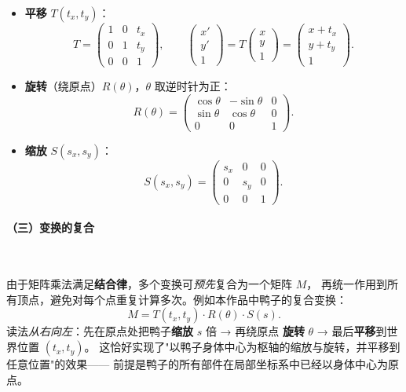 \documentclass[12pt, a4paper]{article}
\begin{document}
\begin{itemize}[leftmargin=*]
    \item \textbf{平移} $T(t_x, t_y)$：
    \[
    T = \begin{pmatrix}1 & 0 & t_x \\ 0 & 1 & t_y \\ 0 & 0 & 1\end{pmatrix},
    \qquad
    \begin{pmatrix}x' \\ y' \\ 1\end{pmatrix}
    = T \begin{pmatrix}x \\ y \\ 1\end{pmatrix}
    = \begin{pmatrix}x + t_x \\ y + t_y \\ 1\end{pmatrix}.
    \]
    \item \textbf{旋转}（绕原点）$R(\theta)$，$\theta$ 取逆时针为正：
    \[
    R(\theta) = \begin{pmatrix}\cos\theta & -\sin\theta & 0 \\
                                \sin\theta &  \cos\theta & 0 \\
                                       0   &       0     & 1\end{pmatrix}.
    \]
    \item \textbf{缩放} $S(s_x, s_y)$：
    \[
    S(s_x, s_y) = \begin{pmatrix}s_x & 0 & 0 \\ 0 & s_y & 0 \\ 0 & 0 & 1\end{pmatrix}.
    \]
\end{itemize}

\paragraph{（三）变换的复合}~

由于矩阵乘法满足\textbf{结合律}，多个变换可\textit{预先}复合为一个矩阵 $M$，
再统一作用到所有顶点，避免对每个点重复计算多次。例如本作品中鸭子的复合变换：
\[
M = T(t_x, t_y) \cdot R(\theta) \cdot S(s).
\]
读法\textit{从右向左}：先在原点处把鸭子\textbf{缩放} $s$ 倍 → 再绕原点
\textbf{旋转} $\theta$ → 最后\textbf{平移}到世界位置 $(t_x, t_y)$。
这恰好实现了"以鸭子身体中心为枢轴的缩放与旋转，并平移到任意位置"的效果——
前提是鸭子的所有部件在局部坐标系中已经以身体中心为原点。
\end{document}
